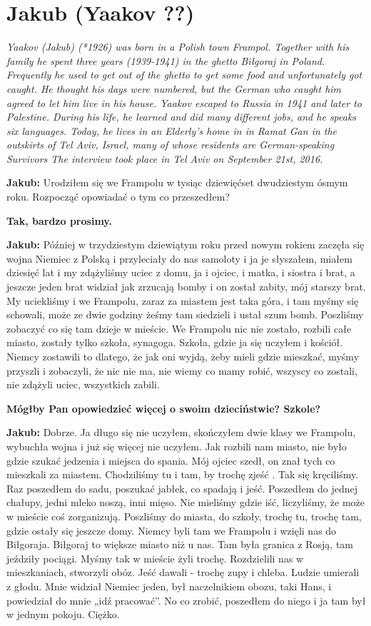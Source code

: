 \section{Jakub (Yaakov ??)}

\textit{Yaakov (Jakub) (*1926) was born in a Polish town Frampol. Together with his family he spent three years (1939-1941) in the ghetto Biłgoraj in Poland. Frequently he used to get out of the ghetto to get some food and unfortunately got caught. He thought his days were numbered, but the German who caught him agreed to let him live in his house. Yaakov escaped to Russia in 1941 and later to Palestine. During his life, he learned and did many different jobs, and he speaks six languages. Today, he lives in an Elderly’s home in in Ramat Gan in the outskirts of Tel Aviv, Israel, many of whose residents are German-speaking Survivors The interview took place in Tel Aviv on September 21st, 2016.}\par
\vspace*{2em}
\textbf{Jakub:} Urodziłem się we Frampolu w tysiąc dziewięćset dwudziestym ósmym roku. Rozpocząć opowiadać o tym co przeszedłem? 

\textbf{Tak, bardzo prosimy.} 

\textbf{Jakub:} Później w trzydziestym dziewiątym roku przed nowym rokiem zaczęła się wojna Niemiec  z Polską i przyleciały do nas samoloty i ja je słyszałem, miałem dziesięć lat i my zdążyliśmy uciec z domu, ja i ojciec, i matka, i siostra i brat,  a jeszcze jeden brat widział jak zrzucają  bomby i on został zabity, mój starszy brat. My uciekliśmy i we Frampolu, zaraz za miastem jest taka góra, i tam myśmy się schowali, może ze dwie godziny żeśmy tam siedzieli i ustał szum bomb. Poszliśmy zobaczyć co się tam dzieje w mieście. We Frampolu nic nie zostało, rozbili całe miasto, zostały tylko szkoła, synagoga. Szkoła, gdzie ja się uczyłem i kościół. Niemcy zostawili to dlatego, że jak oni wyjdą, żeby mieli gdzie mieszkać,  myśmy przyszli i zobaczyli, że nic nie ma, nie wiemy co mamy robić, wszyscy co zostali, nie zdążyli uciec, wszystkich zabili.  

\textbf{Mógłby Pan opowiedzieć więcej o swoim dzieciństwie? Szkole?} 

\textbf{Jakub:} Dobrze. Ja długo się nie uczyłem, skończyłem dwie klasy we Frampolu, wybuchła wojna i już się więcej nie uczyłem. Jak rozbili nam miasto, nie było gdzie szukać jedzenia i miejsca do spania. Mój ojciec szedł, on znał tych co mieszkali za miastem. Chodziliśmy tu i tam, by trochę zjeść . Tak się kręciliśmy. Raz poszedłem do sadu, poszukać jabłek, co spadają i jeść. Poszedłem do jednej chałupy,  jedni mleko noszą, inni mięso. Nie mieliśmy gdzie iść, liczyliśmy, że może w mieście coś zorganizują. Poszliśmy do miasta, do szkoły, trochę tu, trochę tam, gdzie ostały się jeszcze domy. Niemcy byli tam we Frampolu i wzięli nas do Biłgoraja. Biłgoraj to większe miasto niż u nas.  Tam była granica z Rosją, tam jeździły pociągi. Myśmy tak w mieście żyli trochę. Rozdzielili nas w mieszkaniach, stworzyli obóz. Jeść dawali - trochę zupy i chleba. Ludzie umierali z głodu. Mnie widział Niemiec jeden,                       był naczelnikiem obozu, taki Hans, i powiedział do mnie „idź pracować”. No co zrobić, poszedłem do niego i ja tam był w jednym pokoju. Ciężko. 

